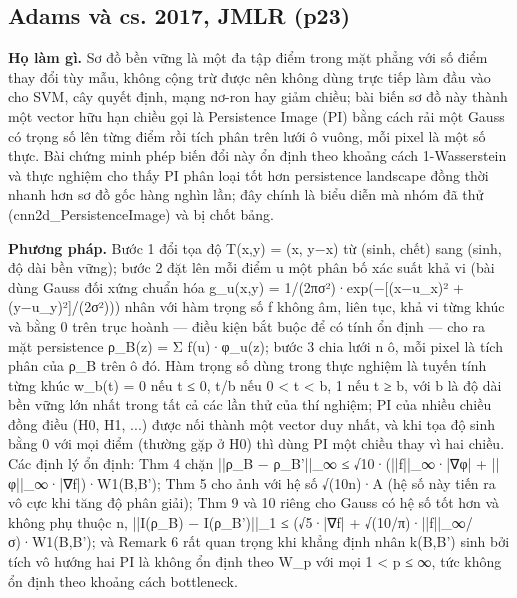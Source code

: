 \documentclass[12pt,a4paper]{article}
\begin{document}
\subsection{Adams và cs. 2017, JMLR \normalfont\small (p23)}
\par\vspace{2pt}
\par\vspace{4pt}
\noindent \textbf{Họ làm gì.} Sơ đồ bền vững là một đa tập điểm trong mặt phẳng với số điểm thay đổi tùy mẫu, không cộng trừ được nên không dùng trực tiếp làm đầu vào cho SVM, cây quyết định, mạng nơ-ron hay giảm chiều; bài biến sơ đồ này thành một vector hữu hạn chiều gọi là Persistence Image (PI) bằng cách rải một Gauss có trọng số lên từng điểm rồi tích phân trên lưới ô vuông, mỗi pixel là một số thực. Bài chứng minh phép biến đổi này ổn định theo khoảng cách 1-Wasserstein và thực nghiệm cho thấy PI phân loại tốt hơn persistence landscape đồng thời nhanh hơn sơ đồ gốc hàng nghìn lần; đây chính là biểu diễn mà nhóm đã thử (cnn2d\_PersistenceImage) và bị chốt bảng.\par\vspace{3pt}
\noindent \textbf{Phương pháp.} Bước 1 đổi tọa độ T(x,y) = (x, y−x) từ (sinh, chết) sang (sinh, độ dài bền vững); bước 2 đặt lên mỗi điểm u một phân bố xác suất khả vi (bài dùng Gauss đối xứng chuẩn hóa g\_u(x,y) = 1/(2πσ²)·exp(−[(x−u\_x)² + (y−u\_y)²]/(2σ²))) nhân với hàm trọng số f không âm, liên tục, khả vi từng khúc và bằng 0 trên trục hoành — điều kiện bắt buộc để có tính ổn định — cho ra mặt persistence ρ\_B(z) = Σ f(u)·φ\_u(z); bước 3 chia lưới n ô, mỗi pixel là tích phân của ρ\_B trên ô đó. Hàm trọng số dùng trong thực nghiệm là tuyến tính từng khúc w\_b(t) = 0 nếu t ≤ 0, t/b nếu 0 < t < b, 1 nếu t ≥ b, với b là độ dài bền vững lớn nhất trong tất cả các lần thử của thí nghiệm; PI của nhiều chiều đồng điều (H0, H1, ...) được nối thành một vector duy nhất, và khi tọa độ sinh bằng 0 với mọi điểm (thường gặp ở H0) thì dùng PI một chiều thay vì hai chiều. Các định lý ổn định: Thm 4 chặn ||ρ\_B − ρ\_B'||\_∞ ≤ √10·(||f||\_∞·|∇φ| + ||φ||\_∞·|∇f|)·W1(B,B'); Thm 5 cho ảnh với hệ số √(10n)·A (hệ số này tiến ra vô cực khi tăng độ phân giải); Thm 9 và 10 riêng cho Gauss có hệ số tốt hơn và không phụ thuộc n, ||I(ρ\_B) − I(ρ\_B')||\_1 ≤ (√5·|∇f| + √(10/π)·||f||\_∞/σ)·W1(B,B'); và Remark 6 rất quan trọng khi khẳng định nhân k(B,B') sinh bởi tích vô hướng hai PI là không ổn định theo W\_p với mọi 1 < p ≤ ∞, tức không ổn định theo khoảng cách bottleneck.\par\vspace{3pt}
\end{document}

